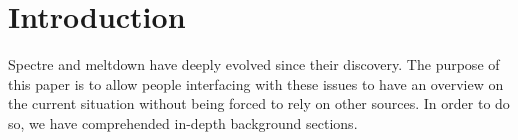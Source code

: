 \section{Introduction}
Spectre and meltdown have deeply evolved since their discovery.
The purpose of this paper is to allow people interfacing with these issues to have an overview on the current situation without being forced to rely on other sources.
In order to do so, we have comprehended in-depth background sections.
